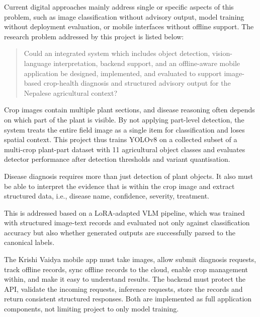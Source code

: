 
Current digital approaches mainly address single or specific aspects of this problem, such as image classification without advisory output, model training without deployment evaluation, or mobile interfaces without offline support.
The research problem addressed by this project is listed below:
\begin{quote} Could an integrated system which includes object detection, vision-language interpretation, backend support, and an offline-aware mobile application be designed, implemented, and evaluated to support image-based crop-health diagnosis and structured advisory output for the Nepalese agricultural context? \end{quote}



Crop images contain multiple plant sections, and disease reasoning often depends on which part of the plant is visible. By not applying part-level detection, the system treats the entire field image as a single item for classification and loses spatial context. This project thus trains YOLOv8 on a collected subset of a multi-crop plant-part dataset with 11 agricultural object classes and evaluates detector performance after detection thresholds and variant quantisation.


Disease diagnosis requires more than just detection of plant objects. It also must be able to interpret the evidence that is within the crop image and extract structured data, i.e., disease name, confidence, severity, treatment.

This is addressed based on a LoRA-adapted VLM pipeline, which was trained with structured image-text records and evaluated not only against classification accuracy but also whether generated outputs are successfully parsed to the canonical labels.


The Krishi Vaidya mobile app must take images, allow submit diagnosis requests, track offline records, sync offline records to the cloud, enable crop management within, and make it easy to understand results. The backend must protect the API, validate the incoming requests, inference requests, store the records and return consistent structured responses. Both are implemented as full application components, not limiting project to only model training. 

